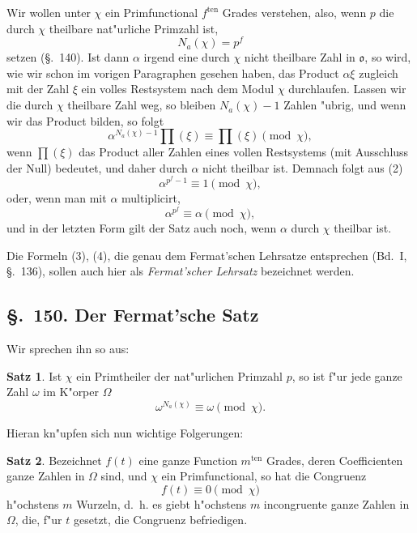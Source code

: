 \documentclass[12pt,a4paper]{article}
\theoremstyle{definition}
\newtheorem*{satz}{Satz}
\begin{document}
Wir wollen unter $\chi$ ein Primfunctional $f^{\text{ten}}$ Grades verstehen, also, wenn $p$ die durch $\chi$ theilbare nat"urliche Primzahl ist,
\begin{equation}
N_a(\chi) = p^f
\end{equation}
setzen (\S.~140). Ist dann $\alpha$ irgend eine durch $\chi$ nicht theilbare Zahl in $\mathfrak{o}$, so wird, wie wir schon im vorigen Paragraphen gesehen haben, das Product $\alpha\xi$ zugleich mit der Zahl $\xi$ ein volles Restsystem nach dem Modul $\chi$ durchlaufen. Lassen wir die durch $\chi$ theilbare Zahl weg, so bleiben $N_a(\chi) - 1$ Zahlen "ubrig, und wenn wir das Product bilden, so folgt
\begin{equation}
\alpha^{N_a(\chi)-1} \prod(\xi) \equiv \prod(\xi) \pmod{\chi},
\end{equation}
wenn $\prod(\xi)$ das Product aller Zahlen eines vollen Restsystems (mit Ausschluss der Null) bedeutet, und daher durch $\alpha$ nicht theilbar ist. Demnach folgt aus (2)
\begin{equation}
\alpha^{p^f-1} \equiv 1 \pmod{\chi},
\end{equation}
oder, wenn man mit $\alpha$ multiplicirt,
\begin{equation}
\alpha^{p^f} \equiv \alpha \pmod{\chi},
\end{equation}
und in der letzten Form gilt der Satz auch noch, wenn $\alpha$ durch $\chi$ theilbar ist.

Die Formeln (3), (4), die genau dem Fermat'schen Lehrsatze entsprechen (Bd.~I, \S.~136), sollen auch hier als \emph{Fermat'scher Lehrsatz} bezeichnet werden.

\subsection*{\S.~150. Der Fermat'sche Satz}

Wir sprechen ihn so aus:

\begin{satz}
Ist $\chi$ ein Primtheiler der nat"urlichen Primzahl $p$, so ist f"ur jede ganze Zahl $\omega$ im K"orper $\Omega$
\begin{equation}
\omega^{N_a(\chi)} \equiv \omega \pmod{\chi}.
\end{equation}
\end{satz}

Hieran kn"upfen sich nun wichtige Folgerungen:

\begin{satz}
Bezeichnet $f(t)$ eine ganze Function $m^{\text{ten}}$ Grades, deren Coefficienten ganze Zahlen in $\Omega$ sind, und $\chi$ ein Primfunctional, so hat die Congruenz
\begin{equation}
f(t) \equiv 0 \pmod{\chi}
\end{equation}
h"ochstens $m$ Wurzeln, d.~h. es giebt h"ochstens $m$ incongruente ganze Zahlen in $\Omega$, die, f"ur $t$ gesetzt, die Congruenz befriedigen.
\end{satz}
\end{document}
